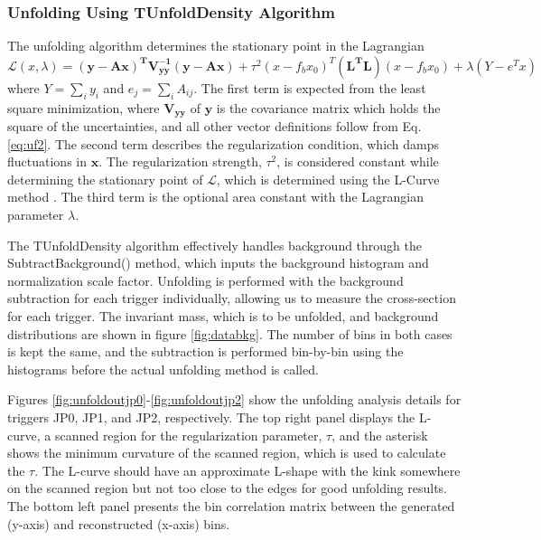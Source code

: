 \subsubsection{Unfolding Using TUnfoldDensity Algorithm}

The unfolding algorithm determines the stationary point in the Lagrangian\cite{Schmitt:2012}
\begin{equation}
    \mathcal{L}(x,\lambda) = \mathbf{(y -Ax)^TV_{yy}^{-1}(y-Ax)}+\tau^2(x-f_bx_0)^T(\mathbf{L^TL})(x-f_bx_0) + \lambda(Y-e^Tx)
\end{equation}
where $Y = \sum_i y_i$ and $e_j = \sum_i A_{ij}$. The first term is expected from the least square minimization, where $\mathbf{V_{yy}}$ of $\mathbf{y}$ is the covariance matrix which holds the square of the uncertainties, and all other vector definitions follow from Eq. \ref{eq:uf2}. The second term describes the regularization condition, which damps fluctuations in $\mathbf{x}$. The regularization strength, $\tau^2$, is considered constant while determining the stationary point of $\mathcal{L}$, which is determined using the L-Curve method \cite{Lcurve}. The third term is the optional area constant with the Lagrangian parameter $\lambda$. 

The TUnfoldDensity algorithm effectively handles background through the SubtractBackground() method, which inputs the background histogram and normalization scale factor. Unfolding is performed with the background subtraction for each trigger individually, allowing us to measure the cross-section for each trigger. The \dipion invariant mass, which is to be unfolded, and background distributions are shown in figure \ref{fig:databkg}. The number of bins in both cases is kept the same, and the subtraction is performed bin-by-bin using the histograms before the actual unfolding method is called. 


Figures \ref{fig:unfoldoutjp0}-\ref{fig:unfoldoutjp2} show the unfolding analysis details for triggers JP0, JP1, and JP2, respectively. The top right panel displays the L-curve, a scanned region for the regularization parameter, $\tau$, and the asterisk shows the minimum curvature of the scanned region, which is used to calculate the $\tau$. The L-curve should have an approximate L-shape with the kink somewhere on the scanned region but not too close to the edges for good unfolding results. The bottom left panel presents the bin correlation matrix between the generated (y-axis) and reconstructed (x-axis) bins. 

